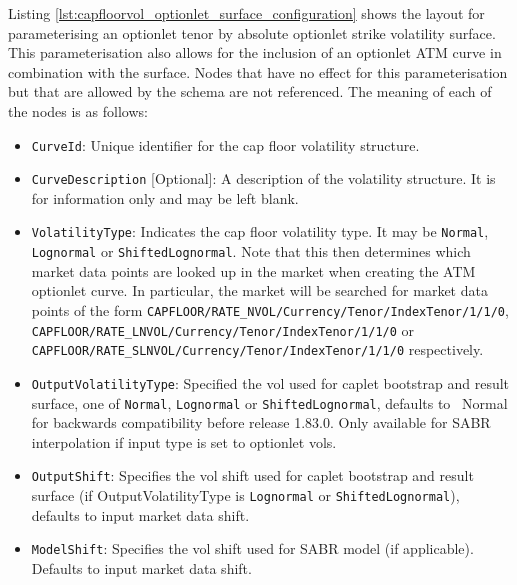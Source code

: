 
Listing \ref{lst:capfloorvol_optionlet_surface_configuration} shows the layout for parameterising an optionlet tenor by absolute optionlet strike volatility surface. This parameterisation also allows for the inclusion of an optionlet ATM curve in combination with the surface. Nodes that have no effect for this parameterisation but that are allowed by the schema are not referenced. The meaning of each of the nodes is as follows:

\begin{itemize}
\item
\lstinline!CurveId!: Unique identifier for the cap floor volatility structure.

\item \lstinline!CurveDescription! [Optional]:
A description of the volatility structure. It is for information only and may be left blank.

\item \lstinline!VolatilityType!:
Indicates the cap floor volatility type. It may be \lstinline!Normal!, \lstinline!Lognormal! or \lstinline!ShiftedLognormal!. Note that this then determines which market data points are looked up in the market when creating the ATM optionlet curve. In particular, the market will be searched for market data points of the form \lstinline!CAPFLOOR/RATE_NVOL/Currency/Tenor/IndexTenor/1/1/0!, \lstinline!CAPFLOOR/RATE_LNVOL/Currency/Tenor/IndexTenor/1/1/0! or \lstinline!CAPFLOOR/RATE_SLNVOL/Currency/Tenor/IndexTenor/1/1/0! respectively.

\item \lstinline!OutputVolatilityType!: Specified the vol used for caplet bootstrap and result surface, one of {\tt Normal},
  {\tt Lognormal} or {\tt ShiftedLognormal}, defaults to {\ Normal} for backwards compatibility before release
  1.83.0. Only available for SABR interpolation if input type is set to optionlet vols.

\item \lstinline!OutputShift!: Specifies the vol shift used for caplet bootstrap and result surface (if OutputVolatilityType is
{\tt Lognormal} or {\tt ShiftedLognormal}), defaults to input market data shift.

\item \lstinline!ModelShift!: Specifies the vol shift used for SABR model (if applicable). Defaults to input market data shift.


\end{itemize}
